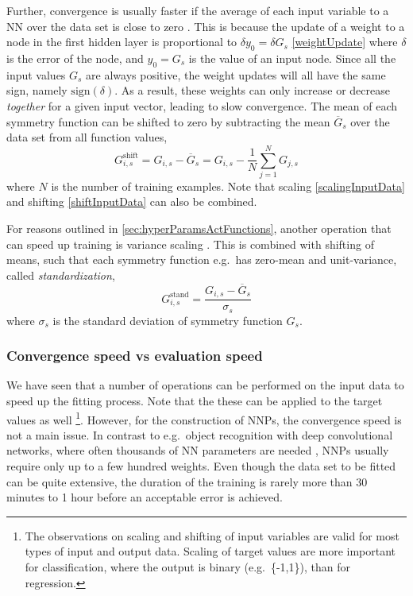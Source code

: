 \documentclass[twoside,english]{uiofysmaster}
\begin{document}
Further, convergence is usually faster if the average of each input variable to a NN over the 
data set is close to zero \cite{LeCun12}.
This is because the update of a weight to a node in the first hidden layer is proportional 
to $\delta y_0 = \delta G_s$ \eqref{weightUpdate} where $\delta$ is the error of the node,
and $y_0 = G_s$ is the value of an input node. 
Since all the input values $G_s$ are always positive, the weight updates will all have the same sign, namely $\mathrm{sign}(\delta)$. 
As a result, these weights can only increase or decrease \textit{together} for a given input vector, leading to slow convergence.
The mean of each symmetry function can be shifted to zero by subtracting the mean $\overline{G}_s$ over the data set from 
all function values,
\begin{equation}
 G_{i,s}^\mathrm{shift} = G_{i,s} - \overline{G}_s =  G_{i,s} - \frac{1}{N}\sum_{j=1}^N G_{j,s}
 \label{shiftInputData}
\end{equation}
where $N$ is the number of training examples. Note that scaling \eqref{scalingInputData} and shifting \eqref{shiftInputData}
can also be combined. 

For reasons outlined in \autoref{sec:hyperParamsActFunctions},
another operation that can speed up training is variance scaling \cite{LeCun12}.
This is combined with shifting of means, such that each symmetry function e.g.\ has zero-mean and unit-variance,
called \textit{standardization},
\begin{equation}
 G_{i,s}^\mathrm{stand} = \frac{G_{i,s} - \overline{G}_s}{\sigma_s} 
 \label{scaleVariance}
\end{equation}
where $\sigma_s$ is the standard deviation of symmetry function $G_s$. 

\subsubsection{Convergence speed vs evaluation speed}
We have seen that a number of operations can be performed on the input data to speed up the fitting process.  
Note that the these can be applied to the target values as well %
\footnote{The observations on scaling and shifting of input variables are valid for most 
types of input and output data. Scaling of target values are more important 
for classification, where the output is binary (e.g.\ \{-1,1\}), than for regression.}. However, for the construction of NNPs, 
the convergence speed is not a main issue. In contrast to e.g.\ object recognition with deep convolutional networks, where
often thousands of NN parameters are needed \cite{LeCun99}, NNPs usually require only up to a few hundred weights. Even though 
the data set to be fitted can be quite extensive, the duration of the training is rarely more than 30 minutes to 1 hour before 
an acceptable error is achieved.
\end{document}
